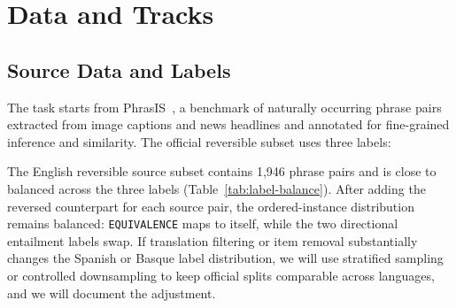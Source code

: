 \documentclass[11pt]{article}
\begin{document}
\section{Data and Tracks}

\subsection{Source Data and Labels}

The task starts from PhrasIS~\cite{10.1093/jigpal/jzae037}, a benchmark of naturally occurring phrase pairs extracted from image captions and news headlines and annotated for fine-grained inference and similarity.
The official reversible subset uses three labels:

\begin{table}[h]
\centering
\small
{}
\caption{Deterministic label-reversal operator used by DiCo-NLI.}
\label{tab:rev}
\end{table}

The English reversible source subset contains 1,946 phrase pairs and is close to balanced across the three labels (Table~\ref{tab:label-balance}).
After adding the reversed counterpart for each source pair, the ordered-instance distribution remains balanced: \texttt{EQUIVALENCE} maps to itself, while the two directional entailment labels swap.
If translation filtering or item removal substantially changes the Spanish or Basque label distribution, we will use stratified sampling or controlled downsampling to keep official splits comparable across languages, and we will document the adjustment.

\begin{table}[h]
\centering
\small
{}
\caption{Label distribution in the English reversible source subset.}
\label{tab:label-balance}
\end{table}
\end{document}
